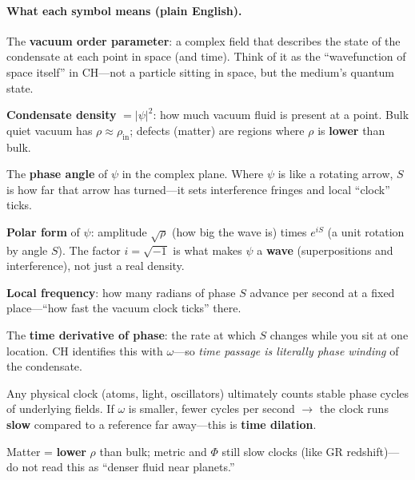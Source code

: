 \documentclass[11pt,a4paper]{article}
\begin{document}
\paragraph{What each symbol means (plain English).}
\begin{description}[style=nextline, leftmargin=1.5em]
  \item[$\psi$ (psi)]
    The \textbf{vacuum order parameter}: a complex field that describes the state of the condensate at each point in space (and time).
    Think of it as the ``wavefunction of space itself'' in CH---not a particle sitting in space, but the medium's quantum state.
  \item[$\rho$ (rho)]
    \textbf{Condensate density} $= |\psi|^2$: how much vacuum fluid is present at a point.
    Bulk quiet vacuum has $\rho \approx \rho_{\mathrm{in}}$; defects (matter) are regions where $\rho$ is \textbf{lower} than bulk.
  \item[$S$ (phase)]
    The \textbf{phase angle} of $\psi$ in the complex plane.
    Where $\psi$ is like a rotating arrow, $S$ is how far that arrow has turned---it sets interference fringes and local ``clock'' ticks.
  \item[$\sqrt{\rho}\,e^{iS}$]
    \textbf{Polar form} of $\psi$: amplitude $\sqrt{\rho}$ (how big the wave is) times $e^{iS}$ (a unit rotation by angle $S$).
    The factor $i=\sqrt{-1}$ is what makes $\psi$ a \textbf{wave} (superpositions and interference), not just a real density.
  \item[$\omega$ (omega)]
    \textbf{Local frequency}: how many radians of phase $S$ advance per second at a fixed place---``how fast the vacuum clock ticks'' there.
  \item[$\partial S/\partial t$]
    The \textbf{time derivative of phase}: the rate at which $S$ changes while you sit at one location.
    CH identifies this with $\omega$---so \emph{time passage is literally phase winding} of the condensate.
  \item[Clock rate $\propto \omega$]
    Any physical clock (atoms, light, oscillators) ultimately counts stable phase cycles of underlying fields.
    If $\omega$ is smaller, fewer cycles per second $\to$ the clock runs \textbf{slow} compared to a reference far away---this is \textbf{time dilation}.
  \item[Depletion near mass]
    Matter = \textbf{lower} $\rho$ than bulk; metric and $\Phi$ still slow clocks (like GR redshift)---do not read this as ``denser fluid near planets.''
  \item[Flow $\mathbf{v}$]

\end{description}
\end{document}
